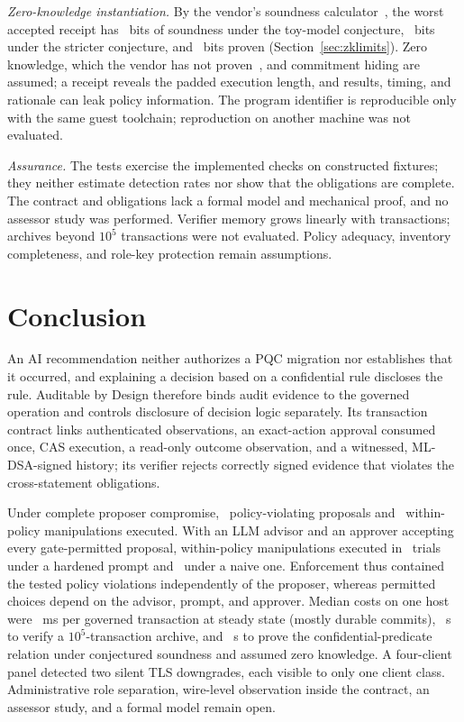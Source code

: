 \emph{Zero-knowledge instantiation.} By the vendor's soundness calculator~\cite{risc0}, the worst accepted receipt has \ZkEndBits~bits of soundness under the toy-model conjecture, \ZkStrictBits~bits under the stricter conjecture, and \ZkProvenBits~bits proven (Section~\ref{sec:zklimits}). Zero knowledge, which the vendor has not proven~\cite{risc0sec}, and commitment hiding are assumed; a receipt reveals the padded execution length, and results, timing, and rationale can leak policy information. The program identifier is reproducible only with the same guest toolchain; reproduction on another machine was not evaluated.

\emph{Assurance.} The tests exercise the implemented checks on constructed fixtures; they neither estimate detection rates nor show that the obligations are complete. The contract and obligations lack a formal model and mechanical proof, and no assessor study was performed. Verifier memory grows linearly with transactions; archives beyond $10^5$ transactions were not evaluated. Policy adequacy, inventory completeness, and role-key protection remain assumptions.

\section{Conclusion}
An AI recommendation neither authorizes a PQC migration nor establishes that it occurred, and explaining a decision based on a confidential rule discloses the rule. Auditable by Design therefore binds audit evidence to the governed operation and controls disclosure of decision logic separately. Its transaction contract links authenticated observations, an exact-action approval consumed once, CAS execution, a read-only outcome observation, and a witnessed, ML-DSA-signed history; its verifier rejects correctly signed evidence that violates the cross-statement obligations.

Under complete proposer compromise, \AdvCompViolExecuted\ policy-violating proposals and \AdvCompInPolicyExecuted\ within-policy manipulations executed. With an LLM advisor and an approver accepting every gate-permitted proposal, within-policy manipulations executed in \AdvHardInPolicyExecuted\ trials under a hardened prompt and \AdvNaiveInPolicyExecuted\ under a naive one. Enforcement thus contained the tested policy violations independently of the proposer, whereas permitted choices depend on the advisor, prompt, and approver. Median costs on one host were \TimDurTotal~ms per governed transaction at steady state (mostly durable commits), \ScalHundredKMedR~s to verify a $10^5$-transaction archive, and \ZkProveMed~s to prove the confidential-predicate relation under conjectured soundness and assumed zero knowledge. A four-client panel detected two silent TLS downgrades, each visible to only one client class. Administrative role separation, wire-level observation inside the contract, an assessor study, and a formal model remain open.


